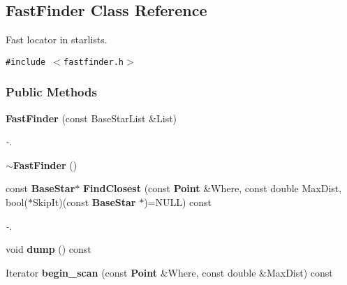 \subsection{Fast\-Finder  Class Reference}
\label{class_fastfinder}
Fast locator in starlists. 


{\tt \#include $<$fastfinder.h$>$}

\subsubsection*{Public Methods}
\begin{CompactItemize}
\item 
{}
{\bf Fast\-Finder} (const Base\-Star\-List \&List)\label{class_fastfinder_a0}

\begin{CompactList}\small\item\em -.\item\end{CompactList}\item 
{}
{\bf $\sim$Fast\-Finder} ()\label{class_fastfinder_a1}

\item 
{}
const {\bf Base\-Star}$\ast$ {\bf Find\-Closest} (const {\bf Point} \&Where, const double Max\-Dist, bool($\ast$Skip\-It)(const {\bf Base\-Star} $\ast$)=NULL) const\label{class_fastfinder_a2}

\begin{CompactList}\small\item\em -.\item\end{CompactList}\item 
{}
void {\bf dump} () const\label{class_fastfinder_a3}

\item 
{}
Iterator {\bf begin\_\-scan} (const {\bf Point} \&Where, const double \&Max\-Dist) const\label{class_fastfinder_a4}


\end{CompactItemize}
